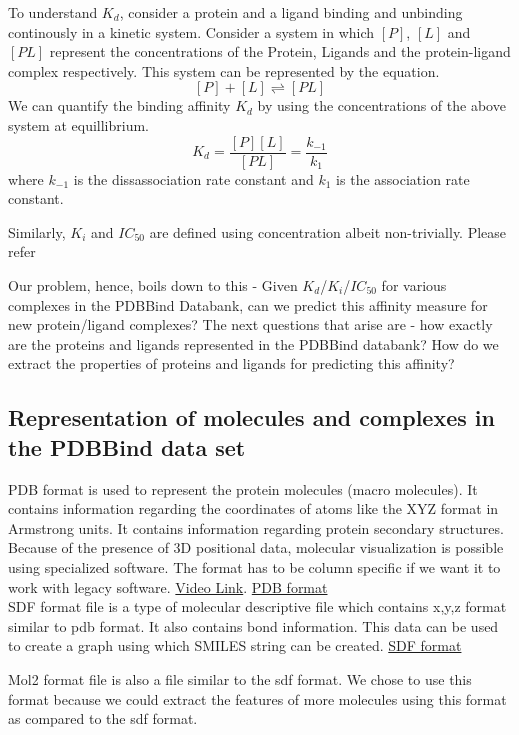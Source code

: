 \documentclass[11pt]{article}
\begin{document}
To understand $K_d$, consider a protein and a ligand binding and unbinding continously in a kinetic system.
Consider a system in which $[P]$, $[L]$ and $[PL]$ represent the concentrations of the Protein, Ligands 
and the protein-ligand complex respectively.
This system can be represented by the equation.
$$[P] + [L] \rightleftharpoons [PL]$$
We can quantify the binding affinity $K_d$ by using the concentrations of the above system at equillibrium.
$$K_d = \frac{[P][L]}{[PL]} = \frac{k_{-1}}{k_1}$$
where $k_{-1}$ is the dissassociation rate constant and $k_1$ is the association rate constant.

Similarly, $K_i$ and $IC_{50}$ are defined using concentration albeit non-trivially. Please refer
\cite{binding_affinity_description}

Our problem, hence, boils down to this - Given $K_d$/$K_i$/$IC_{50}$ for various complexes in the PDBBind Databank,
can we predict this affinity measure for new protein/ligand complexes?
The next questions that arise are - how exactly are the proteins and ligands represented in the PDBBind databank?
How do we extract the properties of proteins and ligands for predicting this affinity?

\subsection{Representation of molecules and complexes in the PDBBind data set}

PDB format is used to represent the protein molecules (macro molecules).
It contains information regarding the coordinates of atoms like the XYZ format in Armstrong units.
It contains information regarding protein secondary structures.
Because of the presence of 3D positional data, molecular visualization is possible using specialized software. 
The format has to be column specific if we want it to work with legacy software.
\href{https://www.youtube.com/watch?v=_1q7sfjl2Kw}{Video Link}.
\href{https://en.wikipedia.org/wiki/Protein_Data_Bank_(file_format)}{PDB format}\\

SDF format file is a type of molecular descriptive file which contains x,y,z format similar to pdb format.
It also contains bond information.
This data can be used to create a graph using which SMILES string can be created.
\href{https://en.wikipedia.org/wiki/Chemical_table_file}{SDF format}

Mol2 format file is also a file similar to the sdf format.
We chose to use this format because we could extract the features of more molecules
using this format as compared to the sdf format.
\end{document}
